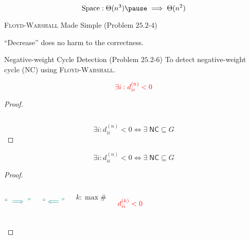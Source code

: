 \begin{frame}{}
  

  \pause
  \[
    \text{Space}: \Theta(n^3) \pause \implies \Theta(n^2)
  \]
\end{frame}

\begin{frame}{}
  \begin{exampleblock}{\textsc{Floyd-Warshall} Made Simple (Problem $25.2$-$4$)}
    
  \end{exampleblock}

  \pause
  \vspace{0.60cm}
  \centerline{``Decrease'' does no harm to the correctness.}
\end{frame}

\begin{frame}{}
  \begin{exampleblock}{Negative-weight Cycle Detection (Problem $25.2$-$6$)}
    To detect negative-weight cycle (\textsf{NC}) using \textsc{Floyd-Warshall}.
  \end{exampleblock}

  \pause
  \[
    \textcolor{red}{\exists i: d_{ii}^{(n)} < 0}
  \]

  \pause
  \begin{proof}
    \begin{columns}
	\pause
	\pause
    \end{columns}

    \pause
    \vspace{0.50cm}
    \[
      \exists i: d_{ii}^{(n)} < 0 \iff \exists\; \textsf{NC} \subseteq G
    \]
  \end{proof}
\end{frame}

\begin{frame}{}
  \[
    \exists i: d_{ii}^{(n)} < 0 \iff \exists\; \textsf{NC} \subseteq G
  \]

  \begin{proof}
    \begin{columns}
        \pause
	\[
	  \textcolor{teal}{``\implies"}
	\]

	\pause
	{\vspace{-0.30cm}\centerline{}}
        \pause
	\[
	  \textcolor{teal}{``\Longleftarrow"}
	\]

	\pause
	{\vspace{-0.30cm}\centerline{}}
	\[
	  k: \max \#
	\]

	\pause
	\[
	  \textcolor{red}{d_{ii}^{(k)} < 0}
	\]
    \end{columns}
  \end{proof}
\end{frame}

